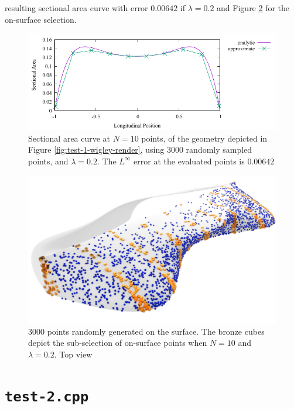 \documentclass{report}
\begin{document}
resulting sectional area curve with error $0.00642$ if $\lambda=0.2$ and Figure \ref{fig:test-1-wigley-render-3K-l-20-N-10-1} for the on-surface selection.
\begin{figure}[H]
    \centering
    \includegraphics[width=0.7\linewidth]{figures/test-1-sac-3K-l-20-N-10.pdf}
    \caption{Sectional area curve at $N=10$ points, of the geometry depicted in Figure \ref{fig:test-1-wigley-render},
    using 3000 randomly sampled points, and $\lambda = 0.2$. The $L^\infty$ error at the evaluated points is $0.00642$}
    \label{fig:test-1-sac-3K-l-20-N-10}
\end{figure}
\begin{figure}[H]
    \centering
    \includegraphics[width=1.0\linewidth]{figures/test-1-wigley-render-3K-l-20-N-10-1.png}
    \caption{3000 points randomly generated on the surface. The bronze cubes depict the sub-selection
    of on-surface points when $N=10$ and $\lambda = 0.2$. Top view}
    \label{fig:test-1-wigley-render-3K-l-20-N-10-1}
\end{figure}

\section{\texttt{test-2.cpp}}
\end{document}
